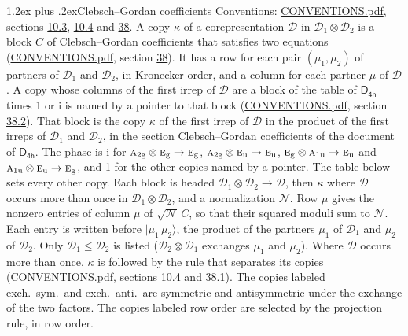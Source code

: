 \documentclass[10pt,a4paper]{article}
\makeatletter
\renewcommand\section{\@startsection{section}{1}{\z@}{-3ex plus -1ex minus -.2ex}%
  {1.2ex plus .2ex}{\normalfont\large\sffamily\bfseries\color{parttitle}}}
\numberwithin{equation}{section}
\newcommand{\grp}[1]{\mathsf{#1}}
\newcommand{\irr}[1]{\text{\normalfont\scshape #1}}
\newcommand{\ptag}[1]{\mathrm{#1}}
\newcommand{\iunit}{\mathrm{i}}
\newcommand{\irrprod}{\otimes}
\newcommand{\mult}{\kappa}
\newcommand{\intx}{\mu}
\newcommand{\cgnorm}{\mathcal{N}}
\newcommand{\prodket}[2]{\lvert {#1}\,{#2}\rangle}
\makeatother
\begin{document}
\section{Clebsch--Gordan coefficients}\label{s:clebsch_gordan}
Conventions: \href{../../CONVENTIONS.pdf}{CONVENTIONS.pdf}, sections \href{../../../rotation/CONVENTIONS.pdf\#conv.10.3}{10.3}, \href{../../../rotation/CONVENTIONS.pdf\#conv.10.4}{10.4} and \href{../../CONVENTIONS.pdf\#conv.38}{38}.
\leavevmode\label{n:index.copy}\label{n:matrix.cg.stored}A copy $\mult$ of a corepresentation $\mathcal{D}$ in $\mathcal{D}_1\irrprod\mathcal{D}_2$ is a block $C$ of Clebsch--Gordan coefficients that satisfies two equations (\href{../../CONVENTIONS.pdf}{CONVENTIONS.pdf}, section \href{../../CONVENTIONS.pdf\#conv.38}{38}). \label{n:index.cg}It has a row for each pair $(\intx_1, \intx_2)$ of partners of $\mathcal{D}_1$ and $\mathcal{D}_2$, in Kronecker order, and a column for each partner $\intx$ of $\mathcal{D}$.
A copy whose columns of the first irrep of $\mathcal{D}$ are a block of the table of $\grp{D_{4h}}$ times 1 or $\iunit$ is named by a pointer to that block (\href{../../CONVENTIONS.pdf}{CONVENTIONS.pdf}, section \href{../../CONVENTIONS.pdf\#conv.38.2}{38.2}). That block is the copy $\mult$ of the first irrep of $\mathcal{D}$ in the product of the first irreps of $\mathcal{D}_1$ and $\mathcal{D}_2$, in the section Clebsch--Gordan coefficients of the document of \href{../../../rotation/data/pdf/D4h.pdf}{$\grp{D_{4h}}$}. The phase is $\iunit$ for $\irr{a}_{2\ptag{g}}\irrprod \irr{e}_{\ptag{g}}\to \irr{e}_{\ptag{g}}$, $\irr{a}_{2\ptag{g}}\irrprod \irr{e}_{\ptag{u}}\to \irr{e}_{\ptag{u}}$, $\irr{e}_{\ptag{g}}\irrprod \irr{a}_{1\ptag{u}}\to \irr{e}_{\ptag{u}}$ and $\irr{a}_{1\ptag{u}}\irrprod \irr{e}_{\ptag{u}}\to \irr{e}_{\ptag{g}}$, and 1 for the other copies named by a pointer. The table below sets every other copy.
Each block is headed $\mathcal{D}_1\irrprod\mathcal{D}_2\to\mathcal{D}$, then $\mult$ where $\mathcal{D}$ occurs more than once in $\mathcal{D}_1\irrprod\mathcal{D}_2$, and a normalization $\cgnorm$. Row $\intx$ gives the nonzero entries of column $\intx$ of $\sqrt{\cgnorm}\,C$, so that their squared moduli sum to $\cgnorm$. \label{n:vector.ket.product}Each entry is written before $\prodket{\intx_1}{\intx_2}$, the product of the partners $\intx_1$ of $\mathcal{D}_1$ and $\intx_2$ of $\mathcal{D}_2$. Only $\mathcal{D}_1 \le \mathcal{D}_2$ is listed ($\mathcal{D}_2\irrprod\mathcal{D}_1$ exchanges $\intx_1$ and $\intx_2$).
Where $\mathcal{D}$ occurs more than once, $\mult$ is followed by the rule that separates its copies (\href{../../CONVENTIONS.pdf}{CONVENTIONS.pdf}, sections \href{../../../rotation/CONVENTIONS.pdf\#conv.10.4}{10.4} and \href{../../CONVENTIONS.pdf\#conv.38.1}{38.1}). \label{n:abbreviation.exchange}The copies labeled exch.\ sym.\ and exch.\ anti.\ are symmetric and antisymmetric under the exchange of the two factors. The copies labeled row order are selected by the projection rule, in row order.
\end{document}
